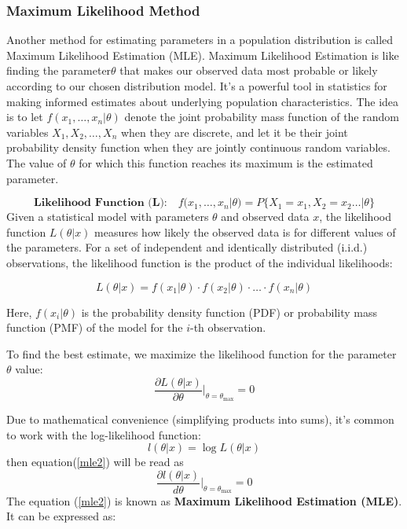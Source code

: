 \documentclass[12pt,a4paper]{article}
\theoremstyle{example}
\theoremstyle{definition}
\theoremstyle{theorem}
\begin{document}
\subsubsection{Maximum Likelihood Method}
Another method for estimating parameters in a population distribution is called Maximum Likelihood Estimation (MLE). Maximum Likelihood Estimation is like finding the parameter$\theta$ that makes our observed data most probable or likely according to our chosen distribution model. It's a powerful tool in statistics for making informed estimates about underlying population characteristics.
The idea is to let $f(x_1, \ldots, x_n | \theta)$ denote the joint probability mass function of the random variables $X_1, X_2, \ldots, X_n$ when they are discrete, and let it be their joint probability density function when they are jointly continuous random variables. The value of $\theta$ for which this function reaches its maximum is the estimated parameter.

\begin{equation}\label{mle1}
 \textbf{Likelihood Function (L):} \quad f(x_1, \ldots, x_n | \theta)= P\{X_1=x_1, X_2=x_2 \dots | \theta\}
\end{equation}
 Given a statistical model with parameters $\theta$ and observed data $x$, the likelihood function $L(\theta | x)$ measures how likely the observed data is for different values of the parameters. For a set of independent and identically distributed (i.i.d.) observations, the likelihood function is the product of the individual likelihoods:

\[ L(\theta | x) = f(x_1 | \theta) \cdot f(x_2 | \theta) \cdot \ldots \cdot f(x_n | \theta) \]

Here, $f(x_i | \theta)$ is the probability density function (PDF) or probability mass function (PMF) of the model for the $i$-th observation.

To find the best estimate, we maximize the likelihood function for the parameter $\theta$ value:
\begin{equation}\label{mle2}
 \frac{\partial L(\theta | x)}{\partial \theta} \bigg|_{\theta = \theta_{\text{max}}} =0
\end{equation}

Due to mathematical convenience (simplifying products into sums), it's common to work with the log-likelihood function:
\begin{equation}\label{mle3}
 l(\theta|x)=\log L(\theta | x)
\end{equation}
then equation(\ref{mle2}) will be read as 
\begin{equation}
    \frac{\partial l(\theta |x)}{d\theta}\bigg|_{\theta=\theta_{\text{max}}}=0
\end{equation}
The equation (\ref{mle2}) is known as  \textbf{Maximum Likelihood Estimation (MLE)}. It can be  expressed as:
\end{document}
